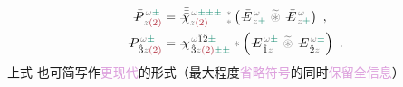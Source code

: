 \begin{subequations} \label{eq:DP^(2)-pm_pmpm}
\begin{align}
	\Xint{\mathcolor{gray}{-}}{30}{\bar{P}}^{\;\! \mathcolor{gray}{\omega} \textcolor{PineGreen}{\pm}}_{\;\! \mathcolor{gray}{z} \textcolor{Maroon}{(2)}} &= \Xint{{}^{}_{\mathcolor{gray}{-}}}{23}{\bar{\bar{\bar{\chi}}}}^{\;\! \mathcolor{gray}{\omega} \textcolor{PineGreen}{\pm \pm \pm}}_{\mathcolor{gray}{z} \textcolor{Maroon}{(2)}} ~{}^{\mathcolor{gray}{*}}_{\mathcolor{gray}{*}} \left( \Xint{\mathcolor{gray}{-}}{295}{\bar{E}}^{\;\!\mathcolor{gray}{\omega}}_{\;\! \mathcolor{gray}{z} \textcolor{PineGreen}{\pm} } ~\mathcolor{gray}{\widetilde \circledast}~ \Xint{\mathcolor{gray}{-}}{295}{\bar{E}}^{\;\!\mathcolor{gray}{\omega}}_{\;\! \mathcolor{gray}{z} \textcolor{PineGreen}{\pm} } \right) ~, \label{eq:vec-DP^(2)-pm_pmpm} \\
	\Xint{\mathcolor{gray}{-}}{30}{P}^{\;\! \mathcolor{gray}{\omega} \textcolor{PineGreen}{\pm}}_{\;\! \hat{3}\mathcolor{gray}{z} \textcolor{Maroon}{(2)}} &= \Xint{{}^{}_{\mathcolor{gray}{-}}}{23}{\chi}^{\;\! \mathcolor{gray}{\omega} \hat{1} \hat{2} \textcolor{PineGreen}{\pm}}_{\;\! \hat{3} \mathcolor{gray}{z} \textcolor{Maroon}{(2)} \textcolor{PineGreen}{\pm \pm}} \mathcolor{gray}{*} \left( \Xint{\mathcolor{gray}{-}}{295}{E}^{\;\!\mathcolor{gray}{\omega} \textcolor{PineGreen}{\pm}}_{\;\! \hat{1} \mathcolor{gray}{z}} ~\mathcolor{gray}{\widetilde \circledast}~ \Xint{\mathcolor{gray}{-}}{295}{E}^{\;\!\mathcolor{gray}{\omega} \textcolor{PineGreen}{\pm}}_{\;\! \hat{2} \mathcolor{gray}{z}} \right) ~. \label{eq:components-DP^(2)-pm_pmpm}
\end{align}
\end{subequations}
上式  也可简写作\textcolor{Plum}{更现代}的形式（最大程度\textcolor{Plum}{省略符号}的同时\textcolor{Plum}{保留全信息}）
